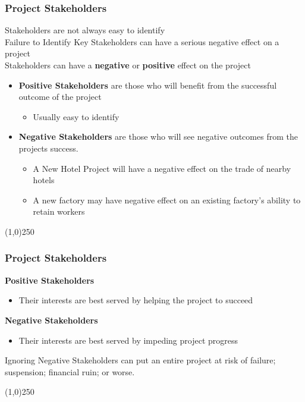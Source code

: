 \begin{frame}
\frametitle{Project Stakeholders}
Stakeholders are not always easy to identify\\
Failure to Identify Key Stakeholders can have a serious negative effect on a project\\
Stakeholders can have a \textbf{negative} or \textbf{positive} effect on the project\\
\begin{itemize}
	\item \textbf{Positive Stakeholders} are those who will benefit from the successful outcome of the project
	\begin{itemize}
		\item Usually easy to identify
	\end{itemize}
	\item \textbf{Negative Stakeholders} are those who will see negative outcomes from the projects success.
	\begin{itemize}
		\item A New Hotel Project will have a negative effect on the trade of nearby hotels
		\item A new factory may have negative effect on an existing factory's ability to retain workers
	\end{itemize}
\end{itemize}
\end{frame}
\begin{center}\line(1,0){250}\end{center}



\begin{frame}
\frametitle{Project Stakeholders}
\textbf{Positive Stakeholders}\\
\begin{itemize}
	\item Their interests are best served by helping the project to succeed
\end{itemize}
\textbf{Negative Stakeholders}\\
\begin{itemize}
	\item Their interests are best served by impeding project progress
\end{itemize}
Ignoring Negative Stakeholders can put an entire project at risk of failure; suspension; financial ruin; or worse.\\
\end{frame}
\begin{center}\line(1,0){250}\end{center}



